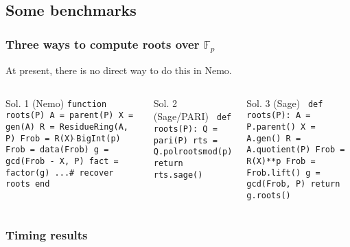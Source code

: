 \documentclass[12pt]{beamer}
\newcommand{\n}{\newline}
\newcommand{\F}{\ensuremath{\mathbb{F}}}
\begin{document}
\subsection{Some benchmarks}


\begin{frame}
\frametitle{Three ways to compute roots over $\F_p$}

At present, there is no direct way to do this in Nemo.

\begin{columns}[t]
 \begin{block}{Sol. 1 (Nemo)}
  \scriptsize\tt function roots(P)\n
    A = parent(P) \n
    X = gen(A) \n
    R = ResidueRing(A, P) \n
    Frob = R(X)$\hat{~}$BigInt(p) \n 
    Frob = data(Frob) \n
    g = gcd(Frob - X, P) \n
    fact = factor(g) \n
    ...\quad\# recover roots \n
    end
 \end{block}

 \begin{block}{Sol. 2 (Sage/PARI)}
  \scriptsize\tt
  def roots(P):\n
   Q = pari(P) \n
   rts = Q.polrootsmod(p) \n
   return rts.sage()
 \end{block}


 \begin{block}{Sol. 3 (Sage)}
  \scriptsize\tt
  def roots(P):\n
    A = P.parent()\n
    X = A.gen()\n
    R = A.quotient(P)\n
    Frob = R(X)**p\n
    Frob = Frob.lift()\n
    g = gcd(Frob, P)\n
    return g.roots()
 \end{block}
\end{columns}

\end{frame}



\begin{frame}[plain]
 \frametitle{Timing results}
 
 \begin{center}
 \end{center}
\end{frame}
\end{document}
